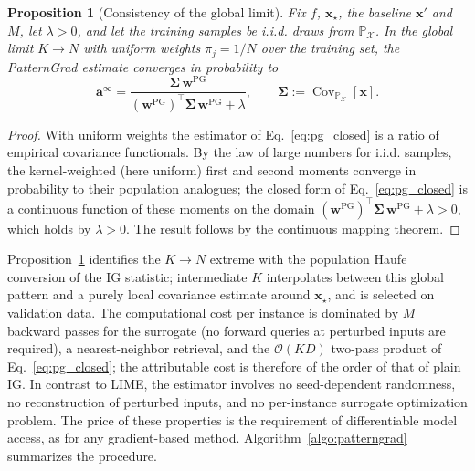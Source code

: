 \documentclass[pdflatex,sn-mathphys-num]{sn-jnl}
\theoremstyle{thmstyleone}
\newtheorem{proposition}[theorem]{Proposition}
\theoremstyle{thmstyletwo}%
\theoremstyle{thmstylethree}%
\begin{document}
\begin{proposition}[Consistency of the global limit]\label{prop:consistency}
Fix $f$, $\mathbf{x}_\star$, the baseline $\mathbf{x}'$ and $M$, let $\lambda > 0$, and let the training samples be i.i.d. draws from $\mathbb{P}_{\mathcal{X}}$. In the global limit $K \to N$ with uniform weights $\pi_j = 1/N$ over the training set, the PatternGrad estimate converges in probability to
\begin{equation}
    \mathbf{a}^{\infty} = \frac{\boldsymbol{\Sigma}\, \mathbf{w}^{\text{PG}}}{(\mathbf{w}^{\text{PG}})^\top \boldsymbol{\Sigma}\, \mathbf{w}^{\text{PG}} + \lambda}, \qquad \boldsymbol{\Sigma} \mathrel{:=} \operatorname{Cov}_{\mathbb{P}_{\mathcal{X}}}[\mathbf{x}].
    \label{eq:pg_limit}
\end{equation}
\end{proposition}

\begin{proof}
With uniform weights the estimator of Eq.~\eqref{eq:pg_closed} is a ratio of empirical covariance functionals. By the law of large numbers for i.i.d. samples, the kernel-weighted (here uniform) first and second moments converge in probability to their population analogues; the closed form of Eq.~\eqref{eq:pg_closed} is a continuous function of these moments on the domain $(\mathbf{w}^{\text{PG}})^\top \boldsymbol{\Sigma}\, \mathbf{w}^{\text{PG}} + \lambda > 0$, which holds by $\lambda > 0$. The result follows by the continuous mapping theorem.
\end{proof}

Proposition~\ref{prop:consistency} identifies the $K \to N$ extreme with the population Haufe conversion of the IG statistic; intermediate $K$ interpolates between this global pattern and a purely local covariance estimate around $\mathbf{x}_\star$, and is selected on validation data. The computational cost per instance is dominated by $M$ backward passes for the surrogate (no forward queries at perturbed inputs are required), a nearest-neighbor retrieval, and the $\mathcal{O}(KD)$ two-pass product of Eq.~\eqref{eq:pg_closed}; the attributable cost is therefore of the order of that of plain IG. In contrast to LIME, the estimator involves no seed-dependent randomness, no reconstruction of perturbed inputs, and no per-instance surrogate optimization problem. The price of these properties is the requirement of differentiable model access, as for any gradient-based method. Algorithm~\ref{algo:patterngrad} summarizes the procedure.
\end{document}
